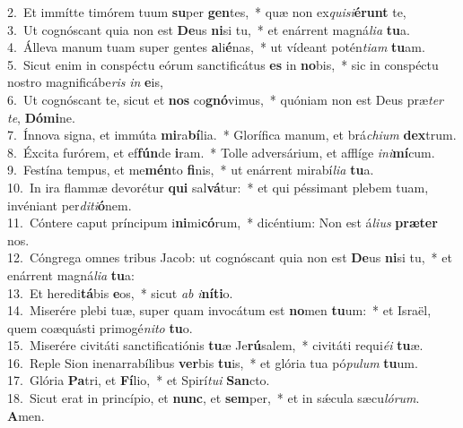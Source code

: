 {2.~}Et immítte timórem tuum \textbf{su}per \textbf{gen}tes,~* quæ non ex\textit{qui}\textit{si}\textbf{é}\textbf{runt} te,\\
{3.~}Ut cognóscant quia non est \textbf{De}us \textbf{ni}si tu,~* et enárrent magná\textit{li}\textit{a} \textbf{tu}a.\\
{4.~}Álleva manum tuam super gentes \textbf{a}li\textbf{é}nas,~* ut vídeant potén\textit{ti}\textit{am} \textbf{tu}am.\\
{5.~}Sicut enim in conspéctu eórum sanctificátus \textbf{es} in \textbf{no}bis,~* sic in conspéctu nostro magnificábe\textit{ris} \textit{in} \textbf{e}is,\\
{6.~}Ut cognóscant te, sicut et \textbf{nos} co\textbf{gnó}vimus,~* quóniam non est Deus præ\textit{ter} \textit{te}, \textbf{Dó}\textbf{mi}ne.\\
{7.~}Ínnova signa, et immúta \textbf{mi}ra\textbf{bí}lia.~* Glorífica manum, et brá\textit{chi}\textit{um} \textbf{dex}trum.\\
{8.~}Éxcita furórem, et ef\textbf{fún}de \textbf{i}ram.~* Tolle adversárium, et afflíge \textit{i}\textit{ni}\textbf{mí}cum.\\
{9.~}Festína tempus, et me\textbf{mén}to \textbf{fi}nis,~* ut enárrent mirabí\textit{li}\textit{a} \textbf{tu}a.\\
{10.~}In ira flammæ devorétur \textbf{qui} sal\textbf{vá}tur:~* et qui péssimant plebem tuam, invéniant per\textit{di}\textit{ti}\textbf{ó}nem.\\
{11.~}Cóntere caput príncipum i\textbf{ni}mi\textbf{có}rum,~* dicéntium: Non est á\textit{li}\textit{us} \textbf{præ}\textbf{ter} nos.\\
{12.~}Cóngrega omnes tribus Jacob: ut cognóscant quia non est \textbf{De}us \textbf{ni}si tu,~* et enárrent magná\textit{li}\textit{a} \textbf{tu}a:\\
{13.~}Et heredi\textbf{tá}bis \textbf{e}os,~* sicut \textit{ab} \textit{i}\textbf{ní}\textbf{ti}o.\\
{14.~}Miserére plebi tuæ, super quam invocátum est \textbf{no}men \textbf{tu}um:~* et Israël, quem coæquásti primogé\textit{ni}\textit{to} \textbf{tu}o.\\
{15.~}Miserére civitáti sanctificatiónis \textbf{tu}æ Je\textbf{rú}salem,~* civitáti requi\textit{é}\textit{i} \textbf{tu}æ.\\
{16.~}Reple Sion inenarrabílibus \textbf{ver}bis \textbf{tu}is,~* et glória tua pó\textit{pu}\textit{lum} \textbf{tu}um.\\
{17.~}Glória \textbf{Pa}tri, et \textbf{Fí}lio,~* et Spirí\textit{tu}\textit{i} \textbf{San}cto.\\
{18.~}Sicut erat in princípio, et \textbf{nunc}, et \textbf{sem}per,~* et in sǽcula sæcu\textit{ló}\textit{rum}. \textbf{A}men.\\
